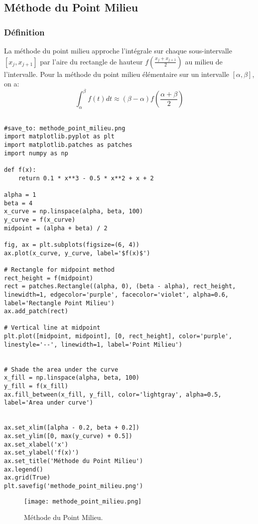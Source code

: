 \documentclass{article}
\begin{document}
\subsection{Méthode du Point Milieu}

\subsubsection{Définition}

La méthode du point milieu approche l'intégrale sur chaque sous-intervalle $[x_j, x_{j+1}]$ par l'aire du rectangle de hauteur $f(\frac{x_j+x_{j+1}}{2})$ au milieu de l'intervalle. Pour la méthode du point milieu élémentaire sur un intervalle $[\alpha, \beta]$, on a:
\[ \int_{\alpha}^{\beta} f(t) dt \approx (\beta - \alpha) f\left(\frac{\alpha + \beta}{2}\right) \]

\begin{verbatim}

#save_to: methode_point_milieu.png
import matplotlib.pyplot as plt
import matplotlib.patches as patches
import numpy as np

def f(x):
    return 0.1 * x**3 - 0.5 * x**2 + x + 2

alpha = 1
beta = 4
x_curve = np.linspace(alpha, beta, 100)
y_curve = f(x_curve)
midpoint = (alpha + beta) / 2

fig, ax = plt.subplots(figsize=(6, 4))
ax.plot(x_curve, y_curve, label='$f(x)$')

# Rectangle for midpoint method
rect_height = f(midpoint)
rect = patches.Rectangle((alpha, 0), (beta - alpha), rect_height, linewidth=1, edgecolor='purple', facecolor='violet', alpha=0.6, label='Rectangle Point Milieu')
ax.add_patch(rect)

# Vertical line at midpoint
plt.plot([midpoint, midpoint], [0, rect_height], color='purple', linestyle='--', linewidth=1, label='Point Milieu')


# Shade the area under the curve
x_fill = np.linspace(alpha, beta, 100)
y_fill = f(x_fill)
ax.fill_between(x_fill, y_fill, color='lightgray', alpha=0.5, label='Area under curve')


ax.set_xlim([alpha - 0.2, beta + 0.2])
ax.set_ylim([0, max(y_curve) + 0.5])
ax.set_xlabel('x')
ax.set_ylabel('f(x)')
ax.set_title('Méthode du Point Milieu')
ax.legend()
ax.grid(True)
plt.savefig('methode_point_milieu.png')

\end{verbatim}

\begin{figure}[h]
    \centering
    \texttt{[image: methode\_point\_milieu.png]}
    \caption{Méthode du Point Milieu.}
    \label{fig:methode_point_milieu}
\end{figure}
\end{document}
